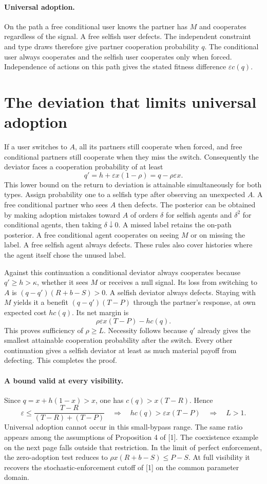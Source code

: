 \documentclass[11pt]{article}
\begin{document}
\paragraph{Universal adoption.}
On the path a free conditional user knows the partner has $M$ and cooperates regardless of the signal. A free selfish user defects. The independent constraint and type draws therefore give partner cooperation probability $q$. The conditional user always cooperates and the selfish user cooperates only when forced. Independence of actions on this path gives the stated fitness difference $\varepsilon c(q)$.

\newpage
\section*{The deviation that limits universal adoption}
If a user switches to $A$, all its partners still cooperate when forced, and free conditional partners still cooperate when they miss the switch. Consequently the deviator faces a cooperation probability of at least
\[
 q'=h+\varepsilon x(1-\rho)=q-\rho\varepsilon x .
\]
This lower bound on the return to deviation is attainable simultaneously for both types. Assign probability one to a selfish type after observing an unexpected $A$. A free conditional partner who sees $A$ then defects. The posterior can be obtained by making adoption mistakes toward $A$ of orders $\delta$ for selfish agents and $\delta^2$ for conditional agents, then taking $\delta\downarrow0$. A missed label retains the on-path posterior. A free conditional agent cooperates on seeing $M$ or on missing the label. A free selfish agent always defects. These rules also cover histories where the agent itself chose the unused label.

Against this continuation a conditional deviator always cooperates because $q'\ge h>\kappa$, whether it sees $M$ or receives a null signal. Its loss from switching to $A$ is $(q-q')(R+b-S)>0$. A selfish deviator always defects. Staying with $M$ yields it a benefit $(q-q')(T-P)$ through the partner's response, at own expected cost $h c(q)$. Its net margin is
\[
                   \rho\varepsilon x(T-P)-h c(q).
\]
This proves sufficiency of $\rho\ge L$. Necessity follows because $q'$ already gives the smallest attainable cooperation probability after the switch. Every other continuation gives a selfish deviator at least as much material payoff from defecting. This completes the proof.

\paragraph{A bound valid at every visibility.}
Since $q=x+h(1-x)>x$, one has $c(q)>x(T-R)$. Hence
\[
 \varepsilon \le \frac{T-R}{(T-R)+(T-P)}
 \quad\Longrightarrow\quad h c(q)>\varepsilon x(T-P)
 \quad\Longrightarrow\quad L>1 .
\]
Universal adoption cannot occur in this small-bypass range. The same ratio appears among the assumptions of Proposition 4 of [1]. The coexistence example on the next page falls outside that restriction. In the limit of perfect enforcement, the zero-adoption test reduces to $\rho x(R+b-S)\le P-S$. At full visibility it recovers the stochastic-enforcement cutoff of [1] on the common parameter domain.
\end{document}
